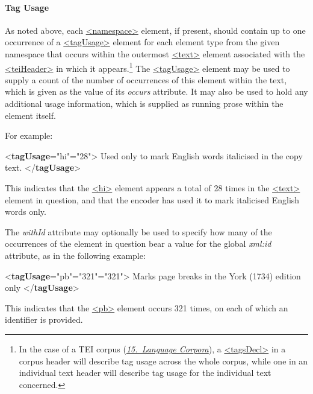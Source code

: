 \paragraph[{Tag Usage}]{Tag Usage}\label{HD57-2}\par
As noted above, each \hyperref[TEI.namespace]{<namespace>} element, if present, should contain up to one occurrence of a \hyperref[TEI.tagUsage]{<tagUsage>} element for each element type from the given namespace that occurs within the outermost \hyperref[TEI.text]{<text>} element associated with the \hyperref[TEI.teiHeader]{<teiHeader>} in which it appears.\footnote{In the case of a TEI corpus (\textit{\hyperref[CC]{15.\ Language Corpora}}), a \hyperref[TEI.tagsDecl]{<tagsDecl>} in a corpus header will describe tag usage across the whole corpus, while one in an individual text header will describe tag usage for the individual text concerned.} The \hyperref[TEI.tagUsage]{<tagUsage>} element may be used to supply a count of the number of occurrences of this element within the text, which is given as the value of its {\itshape occurs} attribute. It may also be used to hold any additional usage information, which is supplied as running prose within the element itself.\par
For example: \par\bgroup{}\exampleFont \begin{shaded}\noindent\mbox{}{<\textbf{tagUsage}\hspace*{1em}{gi}="{hi}"\hspace*{1em}{occurs}="{28}">} Used only to mark English words italicised in the copy text.\mbox{}\newline 
{</\textbf{tagUsage}>}\end{shaded}\egroup\par \noindent  This indicates that the \hyperref[TEI.hi]{<hi>} element appears a total of 28 times in the \hyperref[TEI.text]{<text>} element in question, and that the encoder has used it to mark italicised English words only.\par
The {\itshape withId} attribute may optionally be used to specify how many of the occurrences of the element in question bear a value for the global {\itshape xml:id} attribute, as in the following example: \par\bgroup{}\exampleFont \begin{shaded}\noindent\mbox{}{<\textbf{tagUsage}\hspace*{1em}{gi}="{pb}"\hspace*{1em}{occurs}="{321}"\hspace*{1em}{withId}="{321}">} Marks page breaks in the York\mbox{}\newline 
 (1734) edition only {</\textbf{tagUsage}>}\end{shaded}\egroup\par \noindent  This indicates that the \hyperref[TEI.pb]{<pb>} element occurs 321 times, on each of which an identifier is provided.\par
